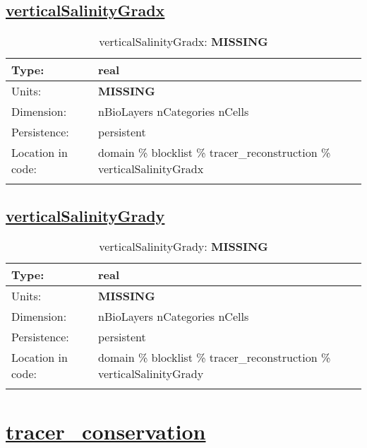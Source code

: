 \subsection[verticalSalinityGradx]{\hyperref[sec:var_tab_tracer_reconstruction]{verticalSalinityGradx}}
\label{subsec:var_sec_tracer_reconstruction_verticalSalinityGradx}
\begin{center}
\begin{longtable}{| p{2.0in} | p{4.0in} |}
        \hline 
        Type: & real \\
        \hline 
        Units: & {\bf \color{red} MISSING} \\
        \hline 
        Dimension: & nBioLayers nCategories nCells \\
        \hline 
        Persistence: & persistent \\
        \hline 
         Location in code: & domain \% blocklist \% tracer\_reconstruction \% verticalSalinityGradx \\
         \hline 
    \caption{verticalSalinityGradx: {\bf \color{red} MISSING}}
\end{longtable}
\end{center}
\subsection[verticalSalinityGrady]{\hyperref[sec:var_tab_tracer_reconstruction]{verticalSalinityGrady}}
\label{subsec:var_sec_tracer_reconstruction_verticalSalinityGrady}
\begin{center}
\begin{longtable}{| p{2.0in} | p{4.0in} |}
        \hline 
        Type: & real \\
        \hline 
        Units: & {\bf \color{red} MISSING} \\
        \hline 
        Dimension: & nBioLayers nCategories nCells \\
        \hline 
        Persistence: & persistent \\
        \hline 
         Location in code: & domain \% blocklist \% tracer\_reconstruction \% verticalSalinityGrady \\
         \hline 
    \caption{verticalSalinityGrady: {\bf \color{red} MISSING}}
\end{longtable}
\end{center}
\section[tracer\_conservation]{\hyperref[sec:var_tab_tracer_conservation]{tracer\_conservation}}
\label{sec:var_sec_tracer_conservation}
